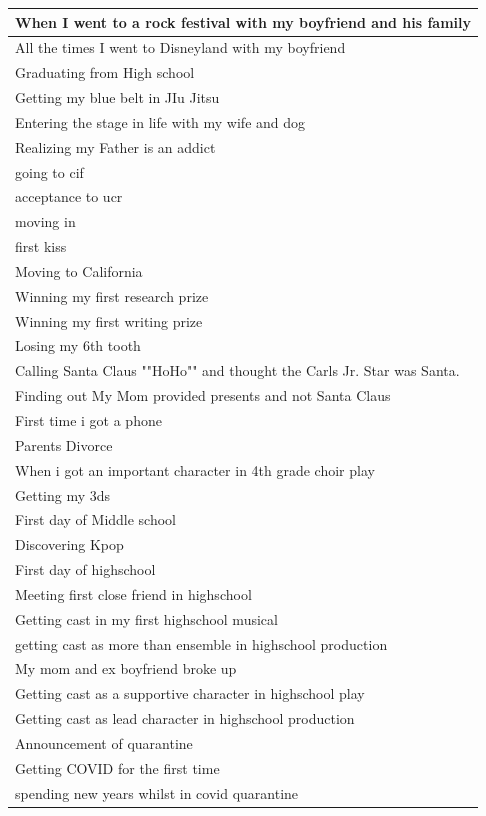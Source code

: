 \documentclass[
  .7em,
  letterpaper,
  DIV=11,
  numbers=noendperiod]{scrartcl}
\begin{document}
\begin{table}
\begin{tabular}{l}
When I went to a rock festival with my boyfriend and his family\\
\hline
All the times I went to Disneyland with my boyfriend\\
\hline
Graduating from High school\\
\hline
Getting my blue belt in JIu Jitsu\\
\hline
Entering the stage in life with my wife and dog\\
\hline
Realizing my Father is an addict\\
\hline
going to cif\\
\hline
acceptance to ucr\\
\hline
moving in\\
\hline
first kiss\\
\hline
Moving to California\\
\hline
Winning my first research prize\\
\hline
Winning my first writing prize\\
\hline
Losing my 6th tooth\\
\hline
Calling Santa Claus ""HoHo"" and thought the Carls Jr. Star was Santa.\\
\hline
Finding out My Mom provided presents and not Santa Claus\\
\hline
First time i got a phone\\
\hline
Parents Divorce\\
\hline
When i got an important character in 4th grade choir play\\
\hline
Getting my 3ds\\
\hline
First day of Middle school\\
\hline
Discovering Kpop\\
\hline
First day of highschool\\
\hline
Meeting first close friend in highschool\\
\hline
Getting cast in my first highschool musical\\
\hline
getting cast as more than ensemble in highschool production\\
\hline
My mom and ex boyfriend broke up\\
\hline
Getting cast as a supportive character in highschool play\\
\hline
Getting cast as lead character in highschool production\\
\hline
Announcement of quarantine\\
\hline
Getting COVID for the first time\\
\hline
spending new years whilst in covid quarantine\\

\end{tabular}
\end{table}
\end{document}
